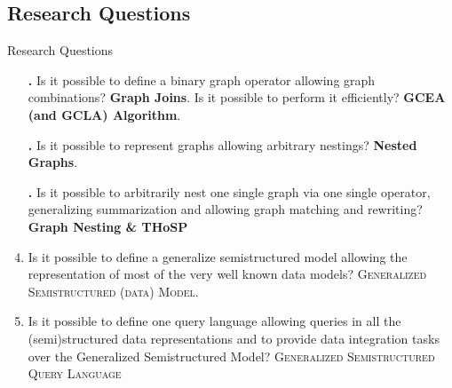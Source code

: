 \subsection{Research Questions}
\begin{frame}{Research Questions}
\begin{enumerate}[<+->]
\item[\refstepcounter{enumi}\textbf{\alert{\arabic{enumi}.}}] Is it possible to define a binary graph operator allowing graph combinations? \textbf{Graph Joins}. Is it possible to perform it efficiently? \textbf{GCEA (and GCLA) Algorithm}.

\item[\refstepcounter{enumi}\textbf{\alert{\arabic{enumi}.}}] Is it possible to represent graphs allowing arbitrary nestings? \textbf{Nested Graphs}.

\item[\refstepcounter{enumi}\textbf{\alert{\arabic{enumi}.}}] Is it possible to arbitrarily nest one single graph via one single operator, generalizing summarization and allowing graph matching and rewriting?
\textbf{Graph Nesting \& THoSP}
\item {\footnotesize Is it possible to define a generalize semistructured model allowing the representation of most of the very well known data models?
\textsc{Generalized Semistructured (data) Model}}.


\item {\footnotesize Is it possible to define one query language allowing  queries in all the (semi)structured data representations and to provide data integration tasks over the Generalized Semistructured Model?
\textsc{Generalized Semistructured Query Language}}
\end{enumerate}

\end{frame}


